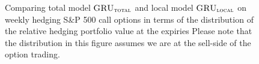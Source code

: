 \documentclass[letterpaper,12pt,titlepage,oneside,final]{book}
\numberwithin{equation}{section}
\theoremstyle{definition}
\newcommand{\modelT}{\textsc{GRU}_{\textsc{total}}}
\newcommand{\modelL}{\textsc{GRU}_{\textsc{local}}}
\begin{document}
\begin{figure}[htp!]
	\centering
	\caption{Comparing total model $\modelT$ and local model $\modelL$ on weekly hedging S\&P 500 call options in terms of the distribution of the  relative hedging portfolio value at the expiries Please note that the distribution in this figure assumes we are at the sell-side of the option trading.} \label{fig:CallTotalW1}
	\centering

\end{figure}
\end{document}
